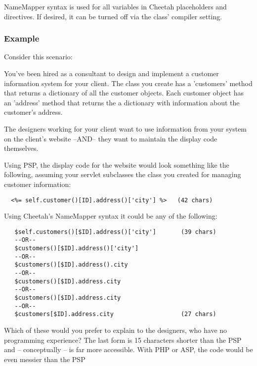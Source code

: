 NameMapper syntax is used for all variables in Cheetah placeholders and
directives. If desired, it can be turned off via the  class'
 compiler setting.

\subsubsection{Example}
\label{language.namemapper.example}

Consider this scenario:

You've been hired as a consultant to design and implement a customer information
system for your client. The class you create has a 'customers' method that
returns a dictionary of all the customer objects.  Each customer object has an
'address' method that returns the a dictionary with information about the
customer's address.

The designers working for your client want to use information from your system
on the client's website --AND-- they want to maintain the display code
themselves.

Using PSP, the display code for the website would look something like the
following, assuming your servlet subclasses the class you created for managing
customer information:


\begin{verbatim}
  <%= self.customer()[ID].address()['city'] %>   (42 chars)
\end{verbatim}

Using Cheetah's NameMapper syntax it could be any of the following:

\begin{verbatim}
   $self.customers()[$ID].address()['city']       (39 chars)
   --OR--                                         
   $customers()[$ID].address()['city']           
   --OR--                                         
   $customers()[$ID].address().city              
   --OR--                                         
   $customers()[$ID].address.city                
   --OR--                                         
   $customers()[$ID].address.city
   --OR--
   $customers[$ID].address.city                   (27 chars)                     
\end{verbatim}   

Which of these would you prefer to explain to the designers, who have no
programming experience?  The last form is 15 characters shorter than the PSP
and -- conceptually -- is far more accessible. With PHP or ASP, the code would be
even messier than the PSP

